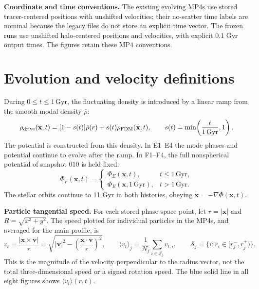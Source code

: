 \documentclass[a4paper,11pt]{article}
\newcommand{\vtmean}{\langle v_t\rangle}
\begin{document}
\textbf{Coordinate and time conventions.}
The existing evolving MP4s use stored tracer-centered positions with
unshifted velocities; their no-scatter time labels are nominal because
the legacy files do not store an explicit time vector. The frozen runs
use unshifted halo-centered positions and velocities, with explicit
0.1 Gyr output times. The figures retain these MP4 conventions.

\clearpage
\section{Evolution and velocity definitions}
During $0\leq t\leq1\,\mathrm{Gyr}$, the fluctuating density is introduced
by a linear ramp from the smooth modal density $\bar\rho$:
\begin{equation}
 \rho_{\rm drive}(\mathbf x,t)=[1-s(t)]\bar\rho(r)
                  +s(t)\rho_{\rm FDM}(\mathbf x,t),
 \qquad s(t)=\min\!\left(\frac{t}{1\,\mathrm{Gyr}},1\right).
\end{equation}
The potential is constructed from this density. In E1--E4 the mode
phases and potential continue to evolve after the ramp. In F1--F4,
the full nonspherical potential of snapshot 010 is held fixed:
\begin{equation}
 \Phi_F(\mathbf x,t)=
 \begin{cases}
  \Phi_E(\mathbf x,t),&t\leq1\,\mathrm{Gyr},\\
  \Phi_E(\mathbf x,1\,\mathrm{Gyr}),&t>1\,\mathrm{Gyr}.
 \end{cases}
\end{equation}
The stellar orbits continue to 11 Gyr in both histories, obeying
$\ddot{\mathbf x}=-\nabla\Phi(\mathbf x,t)$.

\textbf{Particle tangential speed.}
For each stored phase-space point, let $r=|\mathbf x|$ and
$R=\sqrt{x^2+y^2}$. The speed plotted for individual particles in the
MP4s, and averaged for the main profile, is
\begin{equation}
 v_t=\frac{|\mathbf x\times\mathbf v|}{r}
     =\sqrt{|\mathbf v|^2-
       \left(\frac{\mathbf x\cdot\mathbf v}{r}\right)^2},
 \qquad
 \vtmean_j=\frac1{N_j}\sum_{i\in\mathcal S_j}v_{t,i},
 \qquad \mathcal S_j=\{i:r_i\in[r_j^-,r_j^+)\}.
 \label{eq:vt}
\end{equation}
This is the magnitude of the velocity perpendicular to the radius
vector, not the total three-dimensional speed or a signed rotation speed.
The blue solid line in all eight figures shows $\vtmean(r,t)$.
\end{document}
